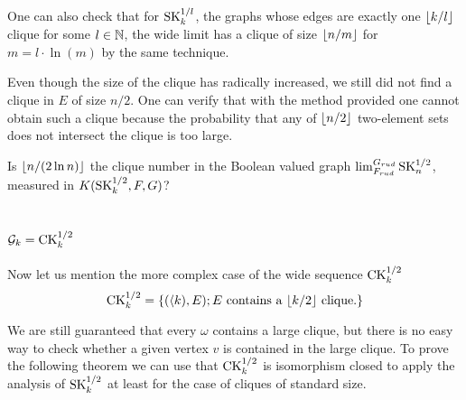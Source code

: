One can also check that for $\text{SK}_{k}^{1/l}$, the graphs whose edges are exactly one $\left \lfloor {k/l} \right \rfloor$ clique for some $l\in \mathbb{N}$, the wide limit has a clique of size $\left \lfloor {n/m} \right \rfloor$ for $m=l\cdot \ln(m)$ by the same technique.

Even though the size of the clique has radically increased, we still did not find a clique in $E$ of size $n/2$. One can verify that with the method provided one cannot obtain such a clique because the probability that any of $\left \lfloor {n/2} \right \rfloor$ two-element sets does not intersect the clique is too large. 

\begin{ques}
Is $\left \lfloor {n/(2\ln n)} \right \rfloor$ the clique number in the Boolean valued graph $\lim_{F_{rud}}^{G_{rud}}\text{SK}_n^{1/2}$, measured in $K(\text{SK}_k^{1/2},F,G)$?
\end{ques}


\section{\texorpdfstring{$\mathcal{G}_k=\text{CK}_k^{1/2}$}{Gk=CKk1/2}}

Now let us mention the more complex case of the wide sequence $\text{CK}_k^{1/2}$
\[\text{CK}_k^{1/2}=\{(\langle k),E);E\text{ contains a $\left \lfloor {k/2} \right \rfloor$ clique.}\}\]

We are still guaranteed that every $\omega$ contains a large clique, but there is no easy way to check whether a given vertex $v$ is contained in the large clique. To prove the following theorem we can use that $\text{CK}_k^{1/2}$ is isomorphism closed to apply the analysis of $\text{SK}_k^{1/2}$ at least for the case of cliques of standard size.

